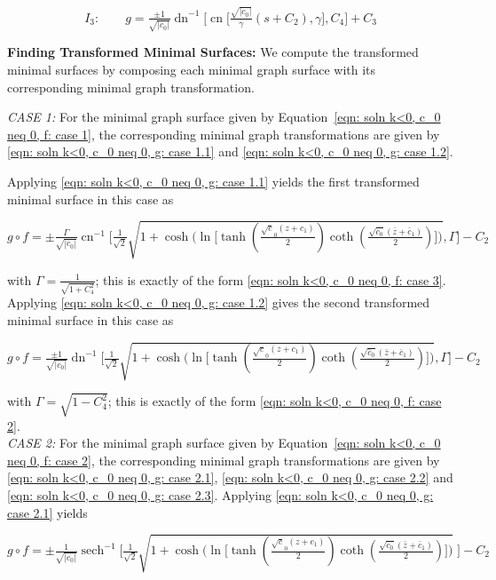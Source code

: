 \documentclass[12pt]{article}
\theoremstyle{plain}
\theoremstyle{definition}
\theoremstyle{remark}
\begin{document}
 \begin{equation}\label{eqn: soln k<0, c_0 neq 0, g: case 3.3}
 	\boxed{I_3:\qquad g=\tfrac{\pm 1}{\sqrt{|c_0|}} \operatorname{dn}^{-1}\big[\operatorname{cn}\big[\tfrac{\sqrt{|c_0|}}{\gamma}(s+C_2),\gamma\big],C_4\big] + C_3}
 \end{equation}
 
  \textbf{Finding Transformed Minimal Surfaces:} We compute the transformed minimal surfaces by composing each minimal graph surface with its corresponding minimal graph transformation.  
  
  \textit{CASE 1:} For the minimal graph surface given by Equation~\ref{eqn: soln k<0, c_0 neq 0, f: case 1}, the corresponding minimal graph transformations are given by \ref{eqn: soln k<0, c_0 neq 0, g: case 1.1} and \ref{eqn: soln k<0, c_0 neq 0, g: case 1.2}.  
  
  \noindent
  Applying \ref{eqn: soln k<0, c_0 neq 0, g: case 1.1} yields the first transformed minimal surface in this case as 
   
  \(
  g\circ f=\pm\tfrac{\Gamma}{\sqrt{|c_0|}}\operatorname{cn}^{-1}\!\Big[\tfrac{1}{\sqrt{2}}\sqrt{1 + \cosh\!\big(\ln\!\big[\tanh(\tfrac{\sqrt c_0(z+c_1)}{2})\coth(\tfrac{\sqrt{\bar c_0}(\bar z+\bar c_1)}{2})\big]\big)},\Gamma\Big]-C_2 
  \) 
  
  \noindent
  with \(\Gamma=\tfrac{1}{\sqrt{1+C_4^2}}\); this is exactly of the form \ref{eqn: soln k<0, c_0 neq 0, f: case 3}. Applying \ref{eqn: soln k<0, c_0 neq 0, g: case 1.2} gives the second transformed minimal surface in this case as 
   
  \(
  g\circ f=\tfrac{\pm1}{\sqrt{|c_0|}}\operatorname{dn}^{-1}\!\Big[\tfrac{1}{\sqrt{2}}\sqrt{1 + \cosh\!\big(\ln\!\big[\tanh(\tfrac{\sqrt c_0(z+c_1)}{2})\coth(\tfrac{\sqrt{\bar c_0}(\bar z+\bar c_1)}{2})\big]\big)},\Gamma\Big]-C_2
  \)  
  
  \noindent
  with \(\Gamma=\sqrt{1-C_4^2}\); this is exactly of the form \ref{eqn: soln k<0, c_0 neq 0, f: case 2}. \\ 
  
  \textit{CASE 2:} For the minimal graph surface given by Equation~\ref{eqn: soln k<0, c_0 neq 0, f: case 2}, the corresponding minimal graph transformations are given by \ref{eqn: soln k<0, c_0 neq 0, g: case 2.1}, \ref{eqn: soln k<0, c_0 neq 0, g: case 2.2} and \ref{eqn: soln k<0, c_0 neq 0, g: case 2.3}.   Applying \ref{eqn: soln k<0, c_0 neq 0, g: case 2.1} yields  
  
  \(
  g\circ f=\pm\tfrac{1}{\sqrt{|c_0|}}\operatorname{sech}^{-1}\!\Big[\tfrac{1}{\sqrt{2}}\sqrt{1 + \cosh\!\big(\ln\!\big[\tanh(\tfrac{\sqrt c_0(z+c_1)}{2})\coth(\tfrac{\sqrt{\bar c_0}(\bar z+\bar c_1)}{2})\big]\big)}\;\Big]-C_2 
  \)  
  
\end{document}
